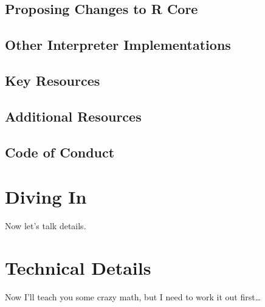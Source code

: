 \documentclass[]{book}
\begin{document}
\hypertarget{proposing-changes-to-r-core}{%
\section{Proposing Changes to R Core}\label{proposing-changes-to-r-core}}

\hypertarget{other-interpreter-implementations}{%
\section{Other Interpreter Implementations}\label{other-interpreter-implementations}}

\hypertarget{key-resources}{%
\section{Key Resources}\label{key-resources}}

\hypertarget{additional-resources}{%
\section{Additional Resources}\label{additional-resources}}

\hypertarget{code-of-conduct}{%
\section{Code of Conduct}\label{code-of-conduct}}

\hypertarget{diving-in}{%
\chapter{Diving In}\label{diving-in}}

Now let's talk details.

\hypertarget{technical-details}{%
\chapter{Technical Details}\label{technical-details}}

Now I'll teach you some crazy math, but I need to work it out first\ldots{}


\end{document}
